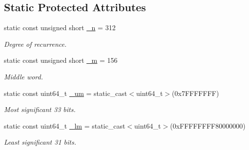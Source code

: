\subsection*{Static Protected Attributes}
\begin{DoxyCompactItemize}
\item 
\mbox{\label{classvarfiles_1_1_generate_m_t_a1baccbd00a9ba762e624a13bfa79a6c7}} 
static const unsigned short \hyperlink{classvarfiles_1_1_generate_m_t_a1baccbd00a9ba762e624a13bfa79a6c7}{\+\_\+n} = 312
\begin{DoxyCompactList}\small\item\em Degree of recurrence. \end{DoxyCompactList}\item 
\mbox{\label{classvarfiles_1_1_generate_m_t_aa0f8cc15e9726d931e5042e16be55cf9}} 
static const unsigned short \hyperlink{classvarfiles_1_1_generate_m_t_aa0f8cc15e9726d931e5042e16be55cf9}{\+\_\+m} = 156
\begin{DoxyCompactList}\small\item\em Middle word. \end{DoxyCompactList}\item 
\mbox{\label{classvarfiles_1_1_generate_m_t_add38df40f5c48eedb86eb1bf8f4fb67e}} 
static const uint64\+\_\+t \hyperlink{classvarfiles_1_1_generate_m_t_add38df40f5c48eedb86eb1bf8f4fb67e}{\+\_\+um} = static\+\_\+cast$<$uint64\+\_\+t$>$(0x7\+F\+F\+F\+F\+F\+F\+F)
\begin{DoxyCompactList}\small\item\em Most significant 33 bits. \end{DoxyCompactList}\item 
\mbox{\label{classvarfiles_1_1_generate_m_t_a69615e65ec1e10bbac2da0c4ec4f8b20}} 
static const uint64\+\_\+t \hyperlink{classvarfiles_1_1_generate_m_t_a69615e65ec1e10bbac2da0c4ec4f8b20}{\+\_\+lm} = static\+\_\+cast$<$uint64\+\_\+t$>$(0x\+F\+F\+F\+F\+F\+F\+F\+F80000000)
\begin{DoxyCompactList}\small\item\em Least significant 31 bits. \end{DoxyCompactList}\item 
\mbox{\label{classvarfiles_1_1_generate_m_t_a5a90cd28215ac0b3272c1a3480bf56ce}} 

\end{DoxyCompactItemize}

